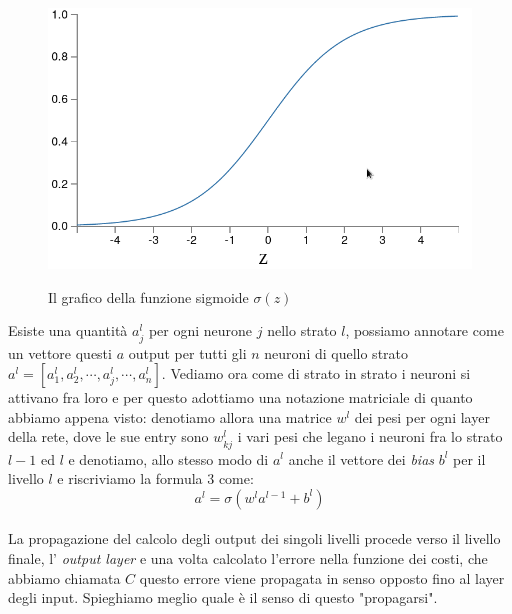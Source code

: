 \begin{figure}[hbtb]
\centering
{\includegraphics[width=.45\textwidth]{media_tesi/sigmoide.png}}
\caption{Il grafico della funzione sigmoide $\sigma(z)$}
\label{fig:subfig}
\end{figure}

Esiste una quantità $ a^{l}_{j} $ per ogni neurone $j$ nello strato $l$, possiamo annotare come un vettore questi $a$ output per tutti gli $n$ neuroni di quello strato $a^{l} = \left[a^{l}_{1},a^{l}_{2}, \cdots, a^{l}_{j}, \cdots, a^{l}_{n}  \right] $. Vediamo ora come di strato in strato i neuroni si attivano fra loro e per questo adottiamo una notazione matriciale di quanto abbiamo appena visto: denotiamo allora una matrice $w^{l}$ dei pesi per ogni layer della rete, dove le sue entry sono $w^{l}_{kj}$ i vari pesi che legano i neuroni fra lo strato $l-1$ ed $l$ e denotiamo, allo stesso modo di $a^{l}$ anche il vettore dei \textit{bias} $b^{l}$ per il livello $l$ e riscriviamo la formula 3 come:
\begin{equation}
	a^{l}=\sigma\left( w^{l}a^{l-1}+b^{l}\right)
\end{equation}
\\
La propagazione del calcolo degli output dei singoli livelli procede verso il livello finale, l' \textit{output layer} e una volta calcolato l'errore nella funzione dei costi, che abbiamo chiamata $C$ questo errore viene propagata in senso opposto fino al layer degli input. Spieghiamo meglio quale è il senso di questo "propagarsi". 

